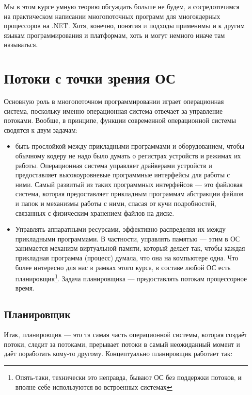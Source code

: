 \documentclass[a5paper]{article}
\begin{document}
Мы в этом курсе умную теорию обсуждать больше не будем, а сосредоточимся на практическом написании многопоточных программ для многоядерных процессоров на .NET. Хотя, конечно, понятия и подходы применимы и к другим языкам программирования и платформам, хоть и могут немного иначе там называться.

\section{Потоки с точки зрения ОС}

Основную роль в многопоточном программировании играет операционная система, поскольку именно операционная система отвечает за управление потоками. Вообще, в принципе, функции современной операционной системы сводятся к двум задачам:

\begin{itemize}
    \item быть прослойкой между прикладными программами и оборудованием, чтобы обычному кодеру не надо было думать о регистрах устройств и режимах их работы. Операционная система управляет драйверами устройств и предоставляет высокоуровневые программные интерфейсы для работы с ними. Самый развитый из таких программных интерфейсов --- это файловая система, которая предоставляет прикладным программам абстракции файлов и папок и механизмы работы с ними, спасая от кучи подробностей, связанных с физическим хранением файлов на диске.
    \item Управлять аппаратными ресурсами, эффективно распределяя их между прикладными программами. В частности, управлять памятью --- этим в ОС занимается механизм виртуальной памяти, который делает так, чтобы каждая прикладная программа (процесс) думала, что она на компьютере одна. Что более интересно для нас в рамках этого курса, в составе любой ОС есть планировщик\footnote{Опять-таки, технически это неправда, бывают ОС без поддержки потоков, и вполне себе используются во встроенных системах}. Задача планировщика --- предоставлять потокам процессорное время.
\end{itemize}

\subsection{Планировщик}

Итак, планировщик --- это та самая часть операционной системы, которая создаёт потоки, следит за потоками, прерывает потоки в самый неожиданный момент и даёт поработать кому-то другому. Концептуально планировщик работает так:
\end{document}
